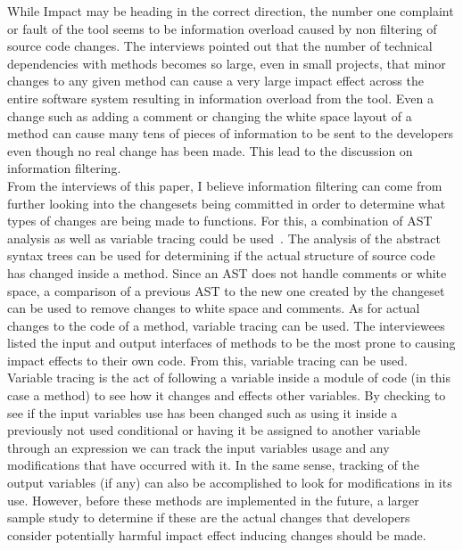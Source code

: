 \documentclass[conference]{IEEEtran}
\begin{document}
While Impact may be heading in the correct direction, the number one complaint or fault
of the tool seems to be information overload caused by non filtering of source code changes.
The interviews pointed out that the number of technical dependencies with methods
becomes so large, even in small projects, that minor changes to any given method can cause
a very large impact effect across the entire software system resulting in information
overload from the tool. Even a change such as adding a comment or changing the 
white space layout of a method can cause many tens of pieces of information to be sent
to the developers even though no real change has been made. This lead to the discussion
on information filtering.\\

From the interviews of this paper, I believe information filtering can come from further 
looking into the changesets being committed in order to determine what types of changes
are being made to functions. For this, a combination of AST analysis as well as variable
tracing could be used~\cite{Neamtiu:2005:USC, Horwitz:1990:IST}. 
The analysis of the abstract syntax trees can be used for determining
if the actual structure of source code has changed inside a method. Since an AST does not
handle comments or white space, a comparison of a previous AST to the new one created by
the changeset can be used to remove changes to white space and comments. As for actual
changes to the code of a method, variable tracing can be used. The interviewees listed the
input and output interfaces of methods to be the most prone to causing impact effects
to their own code. From this, variable tracing can be used. Variable tracing is the act of following
a variable inside a module of code (in this case a method) to see how it changes and effects
other variables. By checking to see if the input variables use has been changed such as
using it inside a previously not used conditional or having it be assigned to another variable
through an expression we can track the input variables usage and any modifications that
have occurred with it. In the same sense, tracking of the output variables (if any) can 
also be accomplished to look for modifications in its use. However, before these methods are implemented
in the future,
a larger sample study to determine if these are the actual changes that developers consider
potentially harmful impact effect inducing changes should be made. \\
\end{document}
